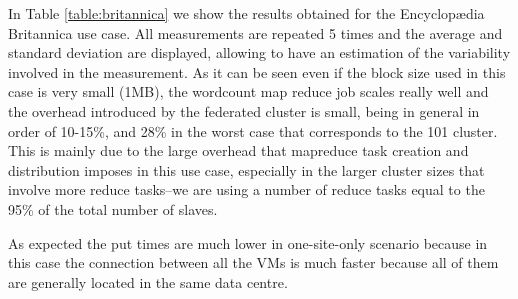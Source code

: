 In Table \ref{table:britannica} we show the results obtained for the Encyclop{\ae}dia Britannica use case. All measurements are repeated 5 times and the average and standard deviation are displayed, allowing to have an estimation of the variability involved in the measurement. As it can be seen even if the block size used in this case is very small (1MB), the wordcount map reduce job scales really well and the overhead introduced by the federated cluster is small, being in general in order of 10-15\%, and 28\% in the worst case that corresponds to the 101 cluster. This is mainly due to the large overhead that mapreduce task creation and distribution imposes in this use case, especially in the larger cluster sizes that involve more reduce tasks--we are using a number of reduce tasks equal to the 95\% of the total number of slaves.

As expected the put times are much lower in one-site-only scenario because in this case the connection between all the VMs is much faster because all of them are generally located in the same data centre.

